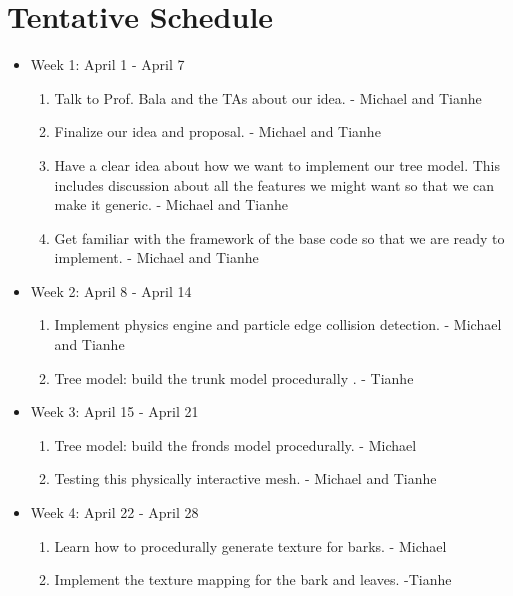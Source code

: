 \documentclass[annual]{acmsiggraph}
\begin{document}
\section{Tentative Schedule}
\begin{itemize}
\item{Week 1: April 1 - April 7}

\begin{enumerate}
\item{Talk to Prof. Bala and the TAs about our idea. - Michael and Tianhe }
\item{Finalize our idea and proposal. - Michael and Tianhe}
\item{Have a clear idea about how we want to implement our tree model. This includes discussion about all the features we might want so that we can make it generic. - Michael and Tianhe}
\item{Get familiar with the framework of the base code so that we are ready to implement. - Michael and Tianhe}
\end{enumerate}

\item{Week 2: April 8 - April 14}

\begin{enumerate}
\item{Implement physics engine and particle edge collision detection. - Michael and Tianhe}
\item{Tree model: build the trunk model procedurally . - Tianhe}
\end{enumerate}

\item{Week 3: April 15 - April 21}

\begin{enumerate}
\item{Tree model: build the fronds model procedurally. - Michael}
\item{Testing this physically interactive mesh. - Michael and Tianhe}

\end{enumerate}

\item{Week 4: April 22 - April 28}

\begin{enumerate}
\item{Learn how to procedurally generate texture for barks. - Michael}
\item{Implement the texture mapping for the bark and leaves. -Tianhe}
\end{enumerate}


\end{itemize}
\end{document}
